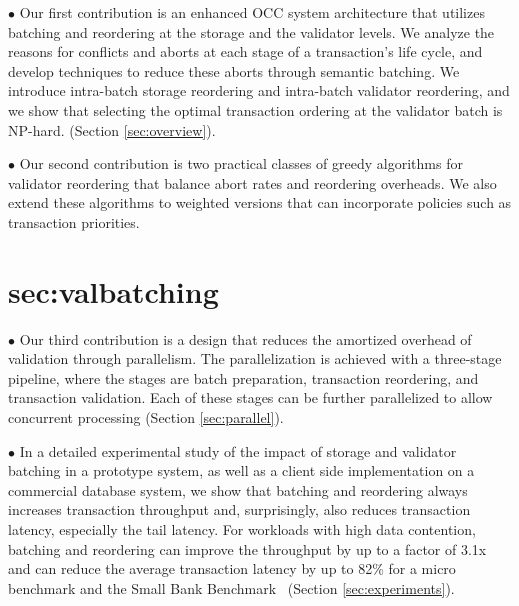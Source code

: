 $\bullet$ Our first contribution is an enhanced OCC system architecture that utilizes batching and reordering at the storage and the validator levels. We analyze the reasons for conflicts and aborts at each stage of a transaction's life cycle, and develop techniques to reduce these aborts through semantic batching.
We introduce intra-batch storage reordering and
intra-batch validator reordering, and we show that selecting the
optimal transaction ordering at the validator batch is NP-hard.
(Section \ref{sec:overview}).

$\bullet$ Our second contribution is 
two practical classes of greedy algorithms for validator reordering 
that balance abort rates and reordering overheads.
We also extend these algorithms to weighted versions that can
incorporate policies such as transaction priorities. \section{sec:valbatching}
$\bullet$ Our third contribution is a design that reduces the amortized overhead of validation through parallelism. The parallelization is achieved with a three-stage pipeline, where the stages are batch preparation, transaction reordering, and transaction validation. Each of these stages can be further parallelized to allow concurrent processing (Section \ref{sec:parallel}).

$\bullet$ In a detailed experimental study of the impact of storage and validator batching in a prototype system, as well as a client side implementation on a commercial database system, we show that batching and reordering always increases transaction throughput and, surprisingly, also reduces transaction latency, especially the tail latency. For workloads with high data contention, batching and reordering can improve the throughput by up to a factor of 3.1x and can reduce the average transaction latency by up to 82\% for a micro benchmark and the Small Bank Benchmark~\cite{alomari2008icde} (Section \ref{sec:experiments}).

